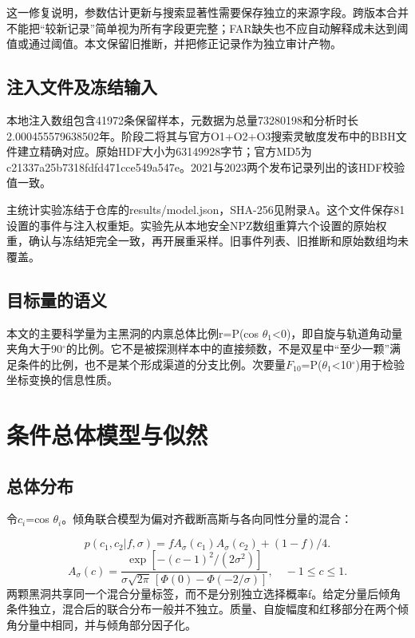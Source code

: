 \documentclass[UTF8,a4paper,11pt,fontset=fandol]{ctexart}
\begin{document}
这一修复说明，参数估计更新与搜索显著性需要保存独立的来源字段。跨版本合并不能把“较新记录”简单视为所有字段更完整；FAR缺失也不应自动解释成未达到阈值或通过阈值。本文保留旧推断，并把修正记录作为独立审计产物。

\subsection{注入文件及冻结输入}\label{sec:2.3}
本地注入数组包含41972条保留样本，元数据为总量73280198和分析时长2.000455579638502年。阶段二将其与官方O1+O2+O3搜索灵敏度发布中的BBH文件建立精确对应\cite{ref8}。原始HDF大小为63149928字节；官方MD5为c21337a25b7318fdfd471cce549a547e。2021与2023两个发布记录列出的该HDF校验值一致。

主统计实验冻结于仓库的results/model.json，SHA-256见附录A。这个文件保存81设置的事件与注入权重矩。实验先从本地安全NPZ数组重算六个设置的原始权重，确认与冻结矩完全一致，再开展重采样。旧事件列表、旧推断和原始数组均未覆盖。

\subsection{目标量的语义}\label{sec:2.4}
本文的主要科学量为主黑洞的内禀总体比例r=P(cos \(\theta_{1}\)<0)，即自旋与轨道角动量夹角大于90\({}^\circ\)的比例。它不是被探测样本中的直接频数，不是双星中“至少一颗”满足条件的比例，也不是某个形成渠道的分支比例。次要量\(F_{10}\)=P(\(\theta_{1}\)<10\({}^\circ\))用于检验坐标变换的信息性质。

\FloatBarrier
\section{条件总体模型与似然}\label{sec:3}
\subsection{总体分布}\label{sec:3.1}
令\(c_{i}\)=cos \(\theta_{i}\)。倾角联合模型为偏对齐截断高斯与各向同性分量的混合：

\begin{equation}\label{eq:1}
p(c_1,c_2|f,\sigma)=f A_\sigma(c_1)A_\sigma(c_2)+(1-f)/4.
\end{equation}
\begin{equation}\label{eq:2}
A_\sigma(c)=\frac{\exp[-(c-1)^2/(2\sigma^2)]}{\sigma\sqrt{2\pi}\,[\Phi(0)-\Phi(-2/\sigma)]},\quad -1\leq c\leq1.
\end{equation}
两颗黑洞共享同一个混合分量标签，而不是分别独立选择概率f。给定分量后倾角条件独立，混合后的联合分布一般并不独立。质量、自旋幅度和红移部分在两个倾角分量中相同，并与倾角部分因子化。
\end{document}
